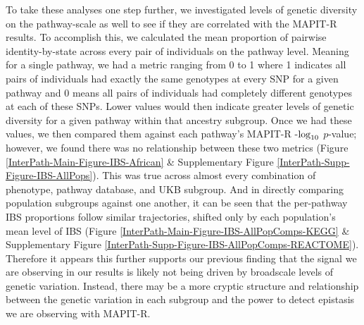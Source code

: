 \documentclass[12pt,a4paper]{article}
\def\log{{\rm log}}
\begin{document}
To take these analyses one step further, we investigated levels of genetic diversity on the pathway-scale as well to see if they are correlated with the MAPIT-R results. To accomplish this, we calculated the mean proportion of pairwise identity-by-state across every pair of individuals on the pathway level. Meaning for a single pathway, we had a metric ranging from 0 to 1 where 1 indicates all pairs of individuals had exactly the same genotypes at every SNP for a given pathway and 0 means all pairs of individuals had completely different genotypes at each of these SNPs. Lower values would then indicate greater levels of genetic diversity for a given pathway within that ancestry subgroup. Once we had these values, we then compared them against each pathway's MAPIT-R -$\log_{10}$ $p$-value; however, we found there was no relationship between these two metrics (Figure \ref{InterPath-Main-Figure-IBS-African} \& Supplementary Figure \ref{InterPath-Supp-Figure-IBS-AllPops}). This was true across almost every combination of phenotype, pathway database, and UKB subgroup. And in directly comparing population subgroups against one another, it can be seen that the per-pathway IBS proportions follow similar trajectories, shifted only by each population's mean level of IBS (Figure \ref{InterPath-Main-Figure-IBS-AllPopComps-KEGG} \& Supplementary Figure \ref{InterPath-Supp-Figure-IBS-AllPopComps-REACTOME}). Therefore it appears this further supports our previous finding that the signal we are observing in our results is likely not being driven by broadscale levels of genetic variation. Instead, there may be a more cryptic structure and relationship between the genetic variation in each subgroup and the power to detect epistasis we are observing with MAPIT-R.

\end{document}
